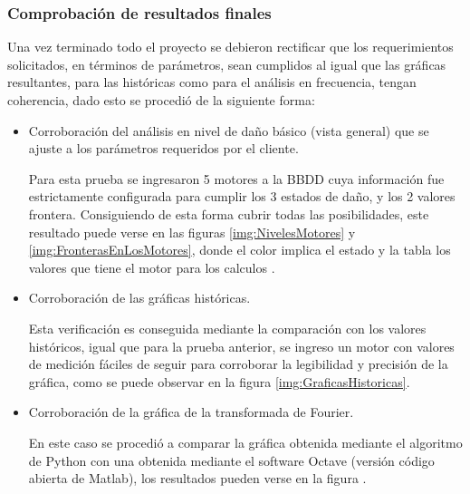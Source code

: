 \subsubsection{Comprobación de resultados finales}
Una vez terminado todo el proyecto se debieron rectificar que los requerimientos
solicitados, en términos de parámetros, sean cumplidos al igual que las gráficas
resultantes, para las históricas como para el análisis en frecuencia, tengan
coherencia, dado esto se procedió de la siguiente forma:

\begin{itemize}
    \item Corroboración del análisis en nivel de daño básico (vista general)
        que se ajuste a los parámetros requeridos por el cliente.

        Para esta prueba se ingresaron 5 motores a la BBDD cuya información fue
        estrictamente configurada para cumplir los 3 estados de daño, y los
        2 valores frontera. Consiguiendo de esta forma cubrir todas las
        posibilidades, este resultado puede verse en las figuras
        \ref{img:NivelesMotores}
        y
        \ref{img:FronterasEnLosMotores},     donde el color
        implica el estado y la tabla los valores que tiene el motor
        para los calculos .


\item Corroboración de las gráficas históricas.

        Esta verificación es conseguida mediante la comparación con los valores
        históricos, igual que para la prueba anterior, se ingreso un motor
        con valores de medición fáciles de seguir para corroborar la legibilidad
        y precisión de la gráfica, como se puede observar en la figura \ref{img:GraficasHistoricas}.

    \item Corroboración de la gráfica de la transformada de Fourier.

        En este caso se procedió a comparar la gráfica obtenida mediante el
        algoritmo de Python con una obtenida mediante el software Octave (versión
        código abierta de Matlab), los resultados pueden verse en la figura .
\end{itemize}







